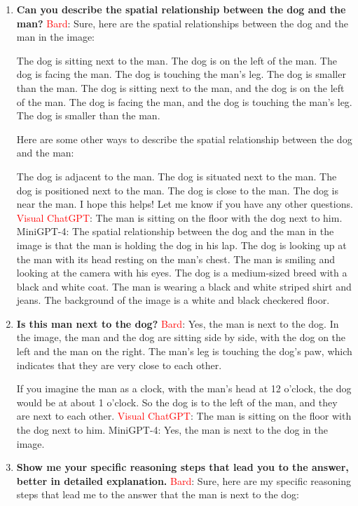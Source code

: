     \begin{enumerate}
        \item \textbf{Can you describe the spatial relationship between the dog and the man?}
        \subitem \textcolor{Red}{Bard}: 
        Sure, here are the spatial relationships between the dog and the man in the image:
        
        The dog is sitting next to the man.
        The dog is on the left of the man.
        The dog is facing the man.
        The dog is touching the man's leg.
        The dog is smaller than the man.
        The dog is sitting next to the man, and the dog is on the left of the man. The dog is facing the man, and the dog is touching the man's leg. The dog is smaller than the man.
        
        Here are some other ways to describe the spatial relationship between the dog and the man:
        
        The dog is adjacent to the man.
        The dog is situated next to the man.
        The dog is positioned next to the man.
        The dog is close to the man.
        The dog is near the man.
        I hope this helps! Let me know if you have any other questions.
        \subitem \textcolor{red}{Visual ChatGPT}: The man is sitting on the floor with the dog next to him.
        \subitem MiniGPT-4: The spatial relationship between the dog and the man in the image is that the man is holding the dog in his lap. The dog is looking up at the man with its head resting on the man’s chest. The man is smiling and looking at the camera with his eyes. The dog is a medium-sized breed with a black and white coat. The man is wearing a black and white striped shirt and jeans. The background of the image is a white and black checkered floor.
        \item \textbf{Is this man next to the dog?}
        \subitem \textcolor{Red}{Bard}: Yes, the man is next to the dog. In the image, the man and the dog are sitting side by side, with the dog on the left and the man on the right. The man's leg is touching the dog's paw, which indicates that they are very close to each other.

        If you imagine the man as a clock, with the man's head at 12 o'clock, the dog would be at about 1 o'clock. So the dog is to the left of the man, and they are next to each other.
        \subitem \textcolor{red}{Visual ChatGPT}: The man is sitting on the floor with the dog next to him.
        \subitem MiniGPT-4: Yes, the man is next to the dog in the image.
        \item \textbf{Show me your specific reasoning steps that lead you to the answer, better in detailed explanation.}
        \subitem \textcolor{Red}{Bard}: 
        Sure, here are my specific reasoning steps that lead me to the answer that the man is next to the dog:
        

\end{enumerate}
